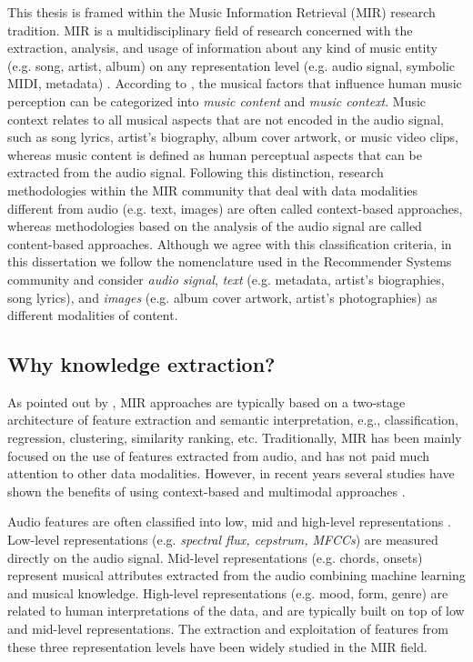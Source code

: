 This thesis is framed within the Music Information Retrieval (MIR) research tradition. 
MIR is a multidisciplinary field of research concerned with the extraction, analysis, and usage of information about any kind of music entity (e.g. song, artist, album) on any representation level (e.g. audio signal, symbolic MIDI, metadata) \citep{schedl2008}. According to \cite{Schedl2013}, the musical factors that influence human music perception can be categorized into \textit{music content} and \textit{music context}. %
Music context relates to all musical aspects that are not encoded in the audio signal, such as song lyrics, artist's biography, album cover artwork, or music video clips, whereas music content is defined as human perceptual aspects that can be extracted from the audio signal. %
Following this distinction, research methodologies within the MIR community that deal with data modalities different from audio (e.g. text, images) are often called context-based approaches, whereas methodologies based on the analysis of the audio signal are called content-based approaches. 
Although we agree with this classification criteria, in this dissertation we follow the nomenclature used in the Recommender Systems community \citep{Ostuni2013} and consider \textit{audio signal}, \textit{text} (e.g. metadata, artist's biographies, song lyrics), and \textit{images} (e.g. album cover artwork, artist's photographies) as different modalities of content.

\subsection{Why knowledge extraction?}
\label{sec:intro:nlp}

As pointed out by \cite{humphrey2012}, MIR approaches are typically based on a two-stage architecture of feature extraction and semantic interpretation, e.g., classification, regression, clustering, similarity ranking, etc. 
Traditionally, MIR has been mainly focused on the use of features extracted from audio, and has not paid much attention to other data modalities. However, in recent years several studies have shown the benefits of using context-based and multimodal approaches \citep{Schedl2014}. 

Audio features are often classified into low, mid and high-level representations \citep{bello2005}. Low-level representations (e.g. \textit{spectral flux, cepstrum, MFCCs}) are measured directly on the audio signal. Mid-level representations (e.g. chords, onsets) represent musical attributes extracted from the audio combining machine learning and musical knowledge. High-level representations (e.g. mood, form, genre) are related to human interpretations of the data, and are typically built on top of low and mid-level representations. The extraction and exploitation of features from these three representation levels have been widely studied in the MIR field. 

